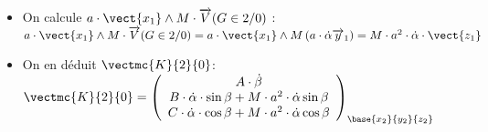 \begin{corrige}
\begin{itemize}
\begin{itemize}
\item On calcule $a\cdot \vect{x_{1}}\wedge M\cdot \overrightarrow{V}(G\in 2/0)$ : 
$
a\cdot \vect{x_{1}}\wedge M\cdot \overrightarrow{V}(G\in 2/0)=
a\cdot \vect{x_{1}}\wedge M\left(a\cdot \dot{\alpha}\overrightarrow{y}_{1} \right)=
M\cdot a^2\cdot \dot{\alpha}\cdot \vect{z_{1}}
$

\item On en déduit $\vectmc{K}{2}{0}$: $
\vectmc{K}{2}{0}=\left(
\begin{array}{c}
A\cdot \dot{\beta}\\
B\cdot \dot{\alpha}\cdot \sin\beta+M\cdot a^2\cdot \dot{\alpha}\sin\beta\\
C\cdot \dot{\alpha}\cdot \cos\beta+M\cdot a^2\cdot \dot{\alpha}\cos\beta\\
\end{array}
\right)_{\base{{x}_2}{{y}_2}{{z}_2}}\\
$
\end{itemize}
\end{itemize}
\end{corrige}
\else
\fi


